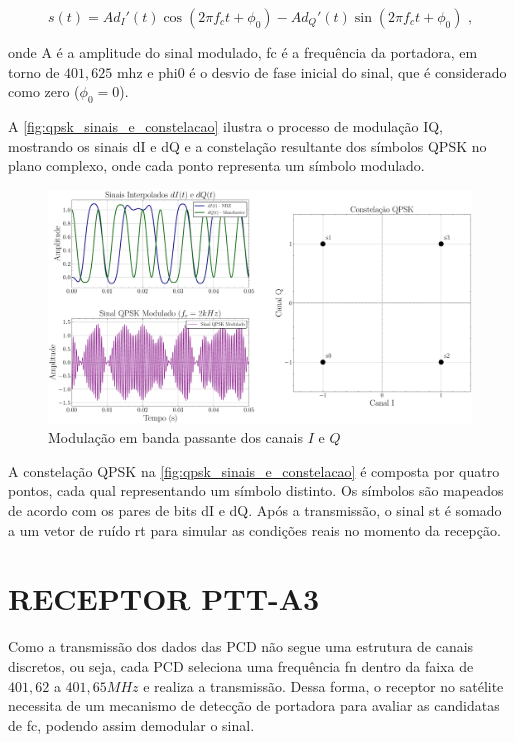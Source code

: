 \vspace{-0.8em}
\begin{equation}
    s(t) = A d_I'(t) \cos(2\pi f_c t + \phi_0) - Ad_Q'(t) \sin(2\pi f_c t + \phi_0) \text{ ,}
\end{equation}

\noindent onde \gls{A} é a amplitude do sinal modulado, \gls{fc} é a frequência da portadora, em torno de $401,625$ \gls{mhz} e \gls{phi0} é o desvio de fase inicial do sinal, que é considerado como zero ($\phi_0 = 0$).

A \autoref{fig:qpsk_sinais_e_constelacao} ilustra o processo de modulação IQ, mostrando os sinais \gls{dI} e \gls{dQ} e a constelação resultante dos símbolos \gls{QPSK} no plano complexo, onde cada ponto representa um símbolo modulado.

\begin{figure}[H]
	\centering
	\caption{Modulação em banda passante dos canais $I$ e $Q$}\label{fig:qpsk_sinais_e_constelacao}
	\includegraphics[width=\linewidth]{assets/qpsk_sinais_e_constelacao.pdf}
\end{figure}

A constelação \gls{QPSK} na \autoref{fig:qpsk_sinais_e_constelacao} é composta por quatro pontos, cada qual representando um símbolo distinto. Os símbolos são mapeados de acordo com os pares de bits \gls{dI} e \gls{dQ}. Após a transmissão, o sinal \gls{st} é somado a um vetor de ruído \gls{rt} para simular as condições reais no momento da recepção.

\section{RECEPTOR PTT-A3}

Como a transmissão dos dados das \gls{PCD} não segue uma estrutura de canais discretos, ou seja, cada \gls{PCD} seleciona uma frequência \gls{fn} dentro da faixa de $401,62$ a $401,65MHz$ e realiza a transmissão. Dessa forma, o receptor no satélite necessita de um mecanismo de detecção de portadora para avaliar as candidatas de \gls{fc}, podendo assim demodular o sinal.

